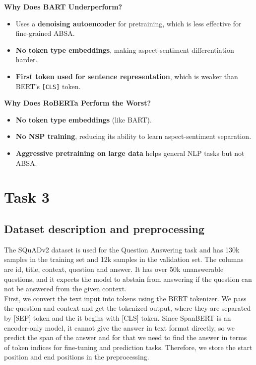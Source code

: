 \documentclass{article}
\begin{document}
\textbf{Why Does BART Underperform?}
\begin{itemize}
    \item Uses a \textbf{denoising autoencoder} for pretraining, which is less effective for fine-grained ABSA.
    \item \textbf{No token type embeddings}, making aspect-sentiment differentiation harder.
    \item \textbf{First token used for sentence representation}, which is weaker than BERT’s \texttt{[CLS]} token.
\end{itemize}

\textbf{Why Does RoBERTa Perform the Worst?}
\begin{itemize}
    \item \textbf{No token type embeddings} (like BART).
    \item \textbf{No NSP training}, reducing its ability to learn aspect-sentiment separation.
    \item \textbf{Aggressive pretraining on large data} helps general NLP tasks but not ABSA.
\end{itemize}

\section{Task 3}

\subsection{Dataset description and preprocessing}
The SQuADv2 dataset is used for the Question Answering task and has 130k samples in the training set and 12k samples in the validation set. The columns are id, title, context, question and answer. It has over 50k unanswerable questions, and it expects the model to abstain from answering if the question can not be answered from the given context.
\\
First, we convert the text input into tokens using the BERT tokenizer. We pass the question and context and get the tokenized output, where they are separated by [SEP] token and the it begins with [CLS] token. Since SpanBERT is an encoder-only model, it cannot give the answer in text format directly, so we predict the span of the answer and for that we need to find the answer in terms of token indices for fine-tuning and prediction tasks. Therefore, we store the start position and end positions in the preprocessing.
\end{document}
